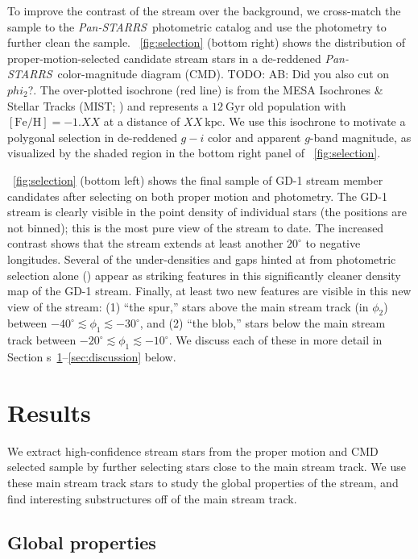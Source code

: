 \documentclass[modern]{aastex62}
\newcommand{\pans}{\textsl{Pan-STARRS}}
\newcommand{\kpc}{\textrm{kpc}}
\newcommand{\feh}{\ensuremath{[\textrm{Fe} / \textrm{H}]}}
\newcommand{\sectionname}{Section}
\newcommand{\todo}[1]{{\color{red} TODO: #1}}
\begin{document}
To improve the contrast of the stream over the background, we cross-match the
sample to the \pans\ photometric catalog and use the photometry to further clean
the sample.
\figurename~\ref{fig:selection} (bottom right) shows the distribution of
proper-motion-selected candidate stream stars in a de-reddened \pans\
color-magnitude diagram (CMD).
\todo{AB: Did you also cut on $phi_2$?}.
The over-plotted isochrone (red line) is from the MESA Isochrones \& Stellar
Tracks (MIST; \citealt{Dotter:2016, Choi:2016, Paxton:2011}) and represents a
$12~\textrm{Gyr}$ old population with $\feh = -1.XX$ at a distance of $XX~\kpc$.
We use this isochrone to motivate a polygonal selection in de-reddened $g-i$
color and apparent $g$-band magnitude, as visualized by the shaded region in the
bottom right panel of \figurename~\ref{fig:selection}.

\figurename~\ref{fig:selection} (bottom left) shows the final sample of GD-1
stream member candidates after selecting on both proper motion and photometry.
The GD-1 stream is clearly visible in the point density of individual stars (the
positions are not binned); this is the most pure view of the stream to date.
The increased contrast shows that the stream extends at least another $20^\circ$
to negative longitudes.
Several of the under-densities and gaps hinted at from photometric selection
alone (\citealt{Koposov:2010, Carlberg:2013}) appear as striking features in
this significantly cleaner density map of the GD-1 stream.
Finally, at least two new features are visible in this new view of the stream:
(1) ``the spur,'' stars above the main stream track (in $\phi_2$) between
$-40^\circ \lesssim \phi_1 \lesssim -30^\circ$, and (2) ``the blob,'' stars
below the main stream track between $-20^\circ \lesssim \phi_1 \lesssim
-10^\circ$.
We discuss each of these in more detail in \sectionname
s~\ref{sec:results}--\ref{sec:discussion} below.


\section{Results}
\label{sec:results}

We extract high-confidence stream stars from the proper motion and CMD selected
sample by further selecting stars close to the main stream track.
We use these main stream track stars to study the global properties of the
stream, and find interesting substructures off of the main stream track.

\subsection{Global properties}
\label{sec:res_global}
\end{document}
